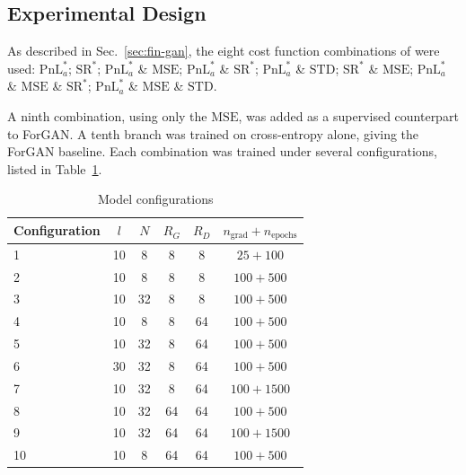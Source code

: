 \subsection{Experimental Design}\label{sec:configurations}

As described in Sec.~\ref{sec:fin-gan}, the eight cost function combinations of \textcite{vuleticFinGANForecastingClassifying2024} were used:
$\mathrm{PnL}^{*}_{a}$;
$\mathrm{SR}^{*}$;
$\mathrm{PnL}^{*}_{a}$ \& $\mathrm{MSE}$;
$\mathrm{PnL}^{*}_{a}$ \& $\mathrm{SR}^{*}$;
$\mathrm{PnL}^{*}_{a}$ \& $\mathrm{STD}$;
$\mathrm{SR}^{*}$ \& $\mathrm{MSE}$;
$\mathrm{PnL}^{*}_{a}$ \& $\mathrm{MSE}$ \& $\mathrm{SR}^{*}$;
$\mathrm{PnL}^{*}_{a}$ \& $\mathrm{MSE}$ \& $\mathrm{STD}$. 

A ninth combination, using only the $\mathrm{MSE}$, was added as a supervised counterpart to ForGAN. A tenth branch was trained on cross-entropy alone, giving the ForGAN baseline. Each combination was trained under several configurations, listed in Table~\ref{tab:configurations}. 

\begin{table}[htbp]
\centering
\begin{tabular}{lccccc}
\toprule
Configuration & $l$ & $N$ & $R_G$ & $R_D$ & $n_{\text{grad}} + n_{\text{epochs}}$ \\
\midrule
1  & 10 & 8  & 8  & 8  & $25 + 100$   \\
2  & 10 & 8  & 8  & 8  & $100 + 500$  \\
3  & 10 & 32 & 8  & 8  & $100 + 500$  \\
4  & 10 & 8  & 8  & 64 & $100 + 500$  \\
5  & 10 & 32 & 8  & 64 & $100 + 500$  \\
6  & 30 & 32 & 8  & 64 & $100 + 500$  \\
7  & 10 & 32 & 8  & 64 & $100 + 1500$ \\
8  & 10 & 32 & 64 & 64 & $100 + 500$  \\
9  & 10 & 32 & 64 & 64 & $100 + 1500$ \\
10 & 10 & 8  & 64 & 64 & $100 + 500$  \\
\bottomrule
\end{tabular}
\caption{Model configurations}
\label{tab:configurations}
\end{table}

